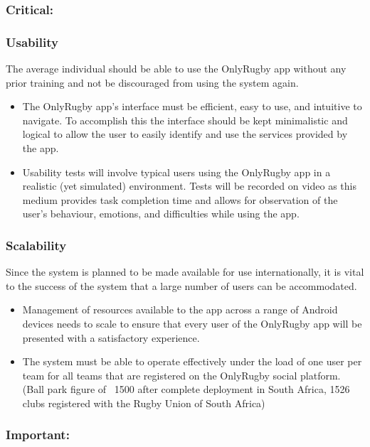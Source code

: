 \documentclass[hidelinks,a4paper,12pt]{article}
\begin{document}
	\subsubsection{Critical:}
	\subsubsection*{Usability}
	The average individual should be able to use the OnlyRugby app without any prior training and not be discouraged from using the system again.
	\begin{itemize}
		\item The OnlyRugby app's interface must be efficient, easy to use, and intuitive to navigate. To accomplish this the interface should be kept minimalistic and logical to allow the user to easily identify and use the services provided by the app.
		\item Usability tests will involve typical users using the OnlyRugby app in a realistic (yet simulated) environment. Tests will be recorded on video as this medium provides task completion time and allows for observation of the user's behaviour, emotions, and difficulties while using the app.
	\end{itemize}
	
	\subsubsection*{Scalability}
	Since the system is planned to be made available for use internationally, it is vital to the success of the system that a large number of users can be accommodated.
	\begin{itemize}
		\item Management of resources available to the app across a range of Android devices needs to scale to ensure that every user of the OnlyRugby app will be presented with a satisfactory experience.
		\item The system must be able to operate effectively under the load of one user per team for all teams that are registered on the OnlyRugby social platform. (Ball park figure of ~1500 after complete deployment in South Africa, 1526 clubs registered with the Rugby Union of South Africa)
	\end{itemize}

	\subsubsection{Important:}
\end{document}
